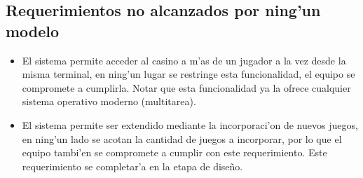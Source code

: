\subsection{Requerimientos no alcanzados por ning'un modelo \label{RND}}

\begin{itemize}
\item {} El sistema permite acceder al casino a m'as de un jugador a la vez desde la misma terminal, en ning'un lugar se restringe esta funcionalidad, el equipo se compromete a cumplirla. Notar que esta  funcionalidad ya la ofrece cualquier sistema operativo moderno (multitarea).

\item {} El sistema permite ser extendido mediante la incorporaci'on de nuevos juegos, en ning'un lado se acotan la cantidad de juegos a incorporar, por lo que el equipo tambi'en se compromete a cumplir con este requerimiento. Este requerimiento se completar'a en la etapa de diseño.
 
\end{itemize}
